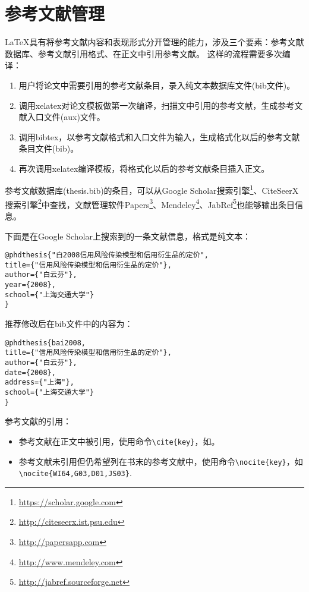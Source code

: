 \section{参考文献管理}
\label{sec2.5}
\LaTeX 具有将参考文献内容和表现形式分开管理的能力，涉及三个要素：参考文献数据库、参考文献引用格式、在正文中引用参考文献。
这样的流程需要多次编译：
\begin{enumerate}[noitemsep,topsep=0pt,parsep=0pt,partopsep=0pt]
\item 用户将论文中需要引用的参考文献条目，录入纯文本数据库文件(bib文件)。
\item 调用xelatex对论文模板做第一次编译，扫描文中引用的参考文献，生成参考文献入口文件(aux)文件。
\item 调用bibtex，以参考文献格式和入口文件为输入，生成格式化以后的参考文献条目文件(bib)。
\item 再次调用xelatex编译模板，将格式化以后的参考文献条目插入正文。
\end{enumerate}

参考文献数据库(thesis.bib)的条目，可以从Google Scholar搜索引擎\footnote{\url{https://scholar.google.com}}、CiteSeerX搜索引擎\footnote{\url{http://citeseerx.ist.psu.edu}}中查找，文献管理软件Papers\footnote{\url{http://papersapp.com}}、Mendeley\footnote{\url{http://www.mendeley.com}}、JabRef\footnote{\url{http://jabref.sourceforge.net}}也能够输出条目信息。

下面是在Google Scholar上搜索到的一条文献信息，格式是纯文本：

\begin{lstlisting}[caption={从Google Scholar找到的参考文献条目}, label=googlescholar, escapeinside="", numbers=none]
@phdthesis{"白2008信用风险传染模型和信用衍生品的定价",
title={"信用风险传染模型和信用衍生品的定价"},
author={"白云芬"},
year={2008},
school={"上海交通大学"}
} 
\end{lstlisting}

推荐修改后在bib文件中的内容为：

\begin{lstlisting}[caption={修改后的参考文献条目}, label=itemok, escapeinside="", numbers=none]
@phdthesis{bai2008,
title={"信用风险传染模型和信用衍生品的定价"},
author={"白云芬"},
date={2008},
address={"上海"},
school={"上海交通大学"}
} 
\end{lstlisting}

参考文献的引用：
\begin{itemize}
\item 参考文献在正文中被引用，使用命令\verb+\cite{key}+，如\cite{M91}。
\item 参考文献未引用但仍希望列在书末的参考文献中，使用命令\verb+\nocite{key}+，如\verb+\nocite{WI64,G03,D01,JS03}+.
\end{itemize}
\nocite{WI64,G03,D01,JS03}